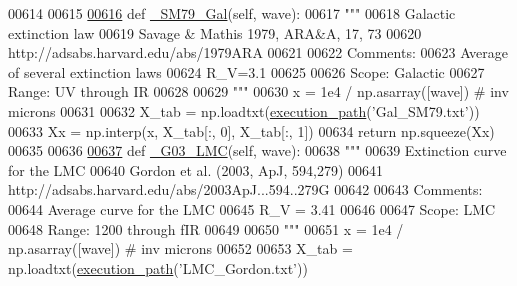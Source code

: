 \begin{DoxyCode}
00614     
00615 
\hypertarget{red__corr_8py_source_l00616}{}\hyperlink{classpyneb_1_1extinction_1_1red__corr_1_1_red_corr_a3c1ed8005a2173f7222d25df3b38e7f2}{00616}     \textcolor{keyword}{def }\hyperlink{classpyneb_1_1extinction_1_1red__corr_1_1_red_corr_a3c1ed8005a2173f7222d25df3b38e7f2}{\_SM79\_Gal}(self, wave):
00617         \textcolor{stringliteral}{"""}
00618 \textcolor{stringliteral}{        Galactic extinction law}
00619 \textcolor{stringliteral}{        Savage & Mathis 1979, ARA&A, 17, 73}
00620 \textcolor{stringliteral}{        http://adsabs.harvard.edu/abs/1979ARA%
00621 \textcolor{stringliteral}{        }
00622 \textcolor{stringliteral}{        Comments:}
00623 \textcolor{stringliteral}{        Average of several extinction laws}
00624 \textcolor{stringliteral}{        R\_V=3.1}
00625 \textcolor{stringliteral}{        }
00626 \textcolor{stringliteral}{        Scope: Galactic}
00627 \textcolor{stringliteral}{        Range: UV through IR}
00628 \textcolor{stringliteral}{        }
00629 \textcolor{stringliteral}{        """}
00630         x = 1e4 / np.asarray([wave]) \textcolor{comment}{# inv microns}
00631 
00632         X\_tab = np.loadtxt(\hyperlink{namespacepyneb_1_1utils_1_1misc_a0e9572755930aabb03c6b0e5d66b8356}{execution\_path}(\textcolor{stringliteral}{'Gal\_SM79.txt'}))
00633         Xx = np.interp(x, X\_tab[:, 0], X\_tab[:, 1])
00634         \textcolor{keywordflow}{return} np.squeeze(Xx)
00635     
00636     
\hypertarget{red__corr_8py_source_l00637}{}\hyperlink{classpyneb_1_1extinction_1_1red__corr_1_1_red_corr_acc965477d452c5914a8af1d8d6116a23}{00637}     \textcolor{keyword}{def }\hyperlink{classpyneb_1_1extinction_1_1red__corr_1_1_red_corr_acc965477d452c5914a8af1d8d6116a23}{\_G03\_LMC}(self, wave):
00638         \textcolor{stringliteral}{"""}
00639 \textcolor{stringliteral}{        Extinction curve for the LMC}
00640 \textcolor{stringliteral}{        Gordon et al. (2003, ApJ, 594,279)}
00641 \textcolor{stringliteral}{        http://adsabs.harvard.edu/abs/2003ApJ...594..279G}
00642 \textcolor{stringliteral}{        }
00643 \textcolor{stringliteral}{        Comments:}
00644 \textcolor{stringliteral}{        Average curve for the LMC}
00645 \textcolor{stringliteral}{        R\_V = 3.41}
00646 \textcolor{stringliteral}{}
00647 \textcolor{stringliteral}{        Scope: LMC}
00648 \textcolor{stringliteral}{        Range: 1200 through fIR   }
00649 \textcolor{stringliteral}{}
00650 \textcolor{stringliteral}{        """}
00651         x = 1e4 / np.asarray([wave]) \textcolor{comment}{# inv microns}
00652 
00653         X\_tab = np.loadtxt(\hyperlink{namespacepyneb_1_1utils_1_1misc_a0e9572755930aabb03c6b0e5d66b8356}{execution\_path}(\textcolor{stringliteral}{'LMC\_Gordon.txt'}))
}
\end{DoxyCode}
